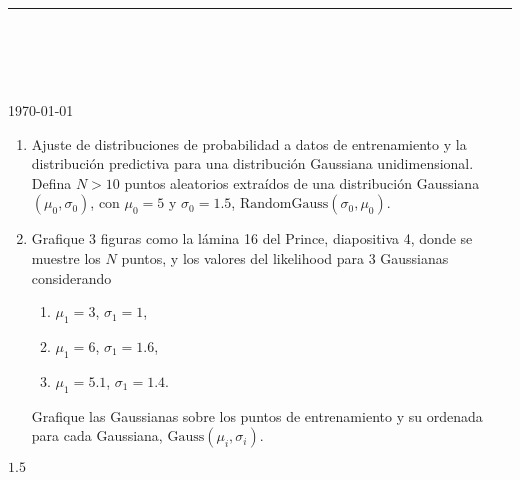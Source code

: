 



\thispagestyle{empty}

\begin{center}
\textsc{\theinstitution}\\[2mm]

\thedepartment

\rule{0.6\textwidth}{0.5pt}\\[2mm]

\thecourse \\[4mm]

{\Large \textbf{\thetitle}}\\[2mm]

\theauthor \\[2mm]

{\small \today}
\end{center}
\medskip

\vspace{1cm}

\begin{enumerate}
    \item Ajuste de distribuciones de probabilidad a datos de entrenamiento y la distribución predictiva para una distribución Gaussiana unidimensional. Defina $N > 10$ puntos aleatorios extraídos de una distribución Gaussiana $(\mu_0, \sigma_0)$, con $\mu_0 = 5$ y $\sigma_0 = 1.5$, $\text{RandomGauss}(\sigma_0, \mu_0)$.
    \item Grafique 3 figuras como la lámina 16 del Prince, diapositiva 4, donde se muestre los $N$ puntos, y los valores del likelihood para 3 Gaussianas considerando
    \begin{enumerate}
        \item $\mu_1 = 3$, $\sigma_1 = 1$,
        \item $\mu_1 = 6$, $\sigma_1 = 1.6$,
        \item $\mu_1 = 5.1$, $\sigma_1 = 1.4$.
    \end{enumerate}
    Grafique las Gaussianas sobre los puntos de entrenamiento y su ordenada para cada Gaussiana, $\text{Gauss}(\mu_i, \sigma_i)$.

\end{enumerate}

\vspace{1cm}

$1.5$


\pagebreak

% 




